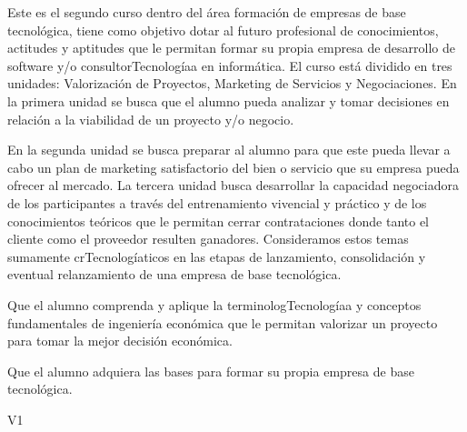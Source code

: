 \begin{syllabus}


\begin{justification}
   Este es el segundo curso dentro del área formación de empresas de base tecnológica, tiene como objetivo dotar al futuro profesional de conocimientos, actitudes y aptitudes que le permitan formar su propia empresa de desarrollo de software y/o consultorTecnologíaa en informática. El curso está dividido en tres unidades: Valorización de Proyectos, Marketing de Servicios y Negociaciones. En la primera unidad se busca que el alumno pueda analizar y tomar decisiones en relación a la viabilidad de un proyecto y/o negocio.
   
   En la segunda unidad se busca preparar al alumno para que este pueda llevar a cabo un plan de marketing satisfactorio del bien o servicio que su empresa pueda ofrecer al mercado. La tercera unidad busca desarrollar la capacidad negociadora de los participantes a través del entrenamiento vivencial y práctico y de los conocimientos teóricos que le permitan cerrar contrataciones donde tanto el cliente como el proveedor resulten ganadores. Consideramos estos temas sumamente crTecnologíaticos en las etapas de lanzamiento, consolidación y eventual relanzamiento de una empresa de base tecnológica.
   \end{justification}
   
   \begin{goals}
   \item Que el alumno comprenda y aplique la terminologTecnologíaa y conceptos fundamentales de ingeniería económica que le permitan valorizar un proyecto para tomar la mejor decisión económica.
   \item Que el alumno adquiera las bases para formar su propia empresa de base tecnológica.
   \end{goals}
   
   \begin{outcomes}{V1}
      \item {}
      \item {}
      \item {}
   \end{outcomes}
   

\end{syllabus}
